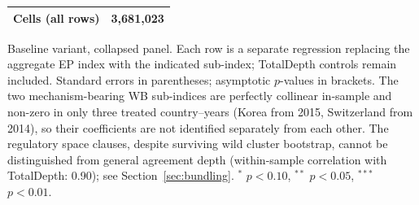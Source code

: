 \begin{table}[htbp]
\begin{threeparttable}
\begin{tabular}{lcc}
\midrule
Cells (all rows) & \multicolumn{2}{c}{3,681,023} \\
\bottomrule
\end{tabular}
\begin{tablenotes}[flushleft]\footnotesize
\item Baseline variant, collapsed panel. Each row is a separate regression replacing the aggregate EP index with the indicated sub-index; TotalDepth controls remain included. Standard errors in parentheses; asymptotic $p$-values in brackets. The two mechanism-bearing WB sub-indices are perfectly collinear in-sample and non-zero in only three treated country--years (Korea from 2015, Switzerland from 2014), so their coefficients are not identified separately from each other. The regulatory space clauses, despite surviving wild cluster bootstrap, cannot be distinguished from general agreement depth (within-sample correlation with TotalDepth: 0.90); see Section~\ref{sec:bundling}. $^{*}$ $p<0.10$, $^{**}$ $p<0.05$, $^{***}$ $p<0.01$.
\end{tablenotes}
\end{threeparttable}
\end{table}
